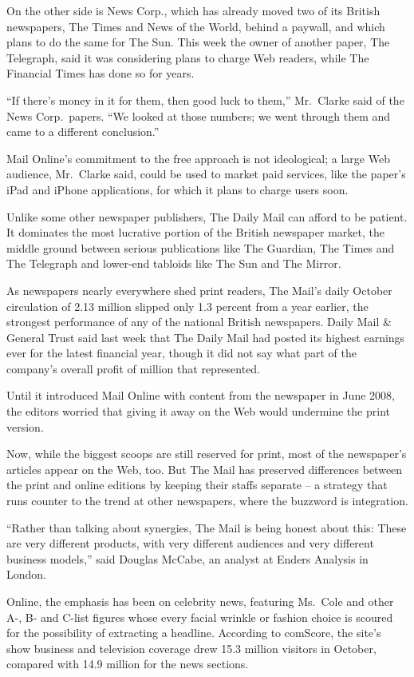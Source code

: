 ﻿\documentclass[12pt]{article}
\begin{document}
On the other side is News Corp., which has already moved two of its British newspapers, The Times
and News of the World, behind a paywall, and which plans to do the same for The Sun. This week the
owner of another paper, The Telegraph, said it was considering plans to charge Web readers, while
The Financial Times has done so for years.

``If there's money in it for them, then good luck to them,'' Mr.~Clarke said of the News
Corp.~papers. ``We looked at those numbers; we went through them and came to a different
conclusion.''

Mail Online's commitment to the free approach is not ideological; a large Web audience, Mr.~Clarke
said, could be used to market paid services, like the paper's iPad and iPhone applications, for
which it plans to charge users soon.

Unlike some other newspaper publishers, The Daily Mail can afford to be patient. It dominates the
most lucrative portion of the British newspaper market, the middle ground between serious
publications like The Guardian, The Times and The Telegraph and lower-end tabloids like The Sun and
The Mirror.

As newspapers nearly everywhere shed print readers, The Mail's daily October circulation of 2.13
million slipped only 1.3 percent from a year earlier, the strongest performance of any of the
national British newspapers. Daily Mail \& General Trust said last week that The Daily Mail had
posted its highest earnings ever for the latest financial year, though it did not say what part of
the company's overall profit of  million that represented.

Until it introduced Mail Online with content from the newspaper in June 2008, the editors worried
that giving it away on the Web would undermine the print version.

Now, while the biggest scoops are still reserved for print, most of the newspaper's articles appear
on the Web, too. But The Mail has preserved differences between the print and online editions by
keeping their staffs separate -- a strategy that runs counter to the trend at other newspapers,
where the buzzword is integration.

``Rather than talking about synergies, The Mail is being honest about this: These are very different
products, with very different audiences and very different business models,'' said Douglas McCabe,
an analyst at Enders Analysis in London.

Online, the emphasis has been on celebrity news, featuring Ms.~Cole and other A-, B- and C-list
figures whose every facial wrinkle or fashion choice is scoured for the possibility of extracting a
headline. According to comScore, the site's show business and television coverage drew 15.3 million
visitors in October, compared with 14.9 million for the news sections.
\end{document}
